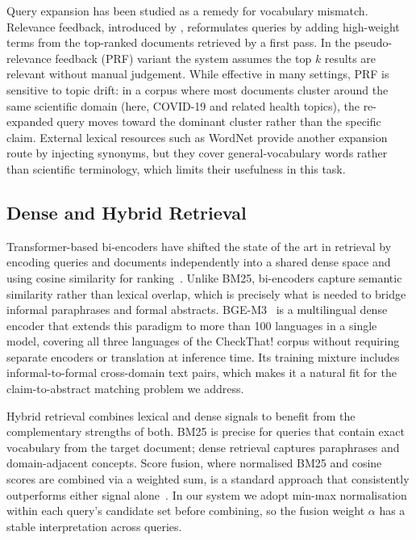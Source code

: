 Query expansion has been studied as a remedy for vocabulary mismatch. Relevance feedback, introduced by \citet{Rocchio1971}, reformulates queries by adding high-weight terms from the top-ranked documents retrieved by a first pass. In the pseudo-relevance feedback (PRF) variant the system assumes the top $k$ results are relevant without manual judgement. While effective in many settings, PRF is sensitive to topic drift: in a corpus where most documents cluster around the same scientific domain (here, COVID-19 and related health topics), the re-expanded query moves toward the dominant cluster rather than the specific claim. External lexical resources such as WordNet provide another expansion route by injecting synonyms, but they cover general-vocabulary words rather than scientific terminology, which limits their usefulness in this task.

\subsection{Dense and Hybrid Retrieval}

Transformer-based bi-encoders have shifted the state of the art in retrieval by encoding queries and documents independently into a shared dense space and using cosine similarity for ranking~\citep{ManningEtAl2008}. Unlike BM25, bi-encoders capture semantic similarity rather than lexical overlap, which is precisely what is needed to bridge informal paraphrases and formal abstracts. BGE-M3~\citep{chen2024bge} is a multilingual dense encoder that extends this paradigm to more than 100 languages in a single model, covering all three languages of the CheckThat! corpus without requiring separate encoders or translation at inference time. Its training mixture includes informal-to-formal cross-domain text pairs, which makes it a natural fit for the claim-to-abstract matching problem we address.

Hybrid retrieval combines lexical and dense signals to benefit from the complementary strengths of both. BM25 is precise for queries that contain exact vocabulary from the target document; dense retrieval captures paraphrases and domain-adjacent concepts. Score fusion, where normalised BM25 and cosine scores are combined via a weighted sum, is a standard approach that consistently outperforms either signal alone~\citep{ManningEtAl2008}. In our system we adopt min-max normalisation within each query's candidate set before combining, so the fusion weight $\alpha$ has a stable interpretation across queries.

